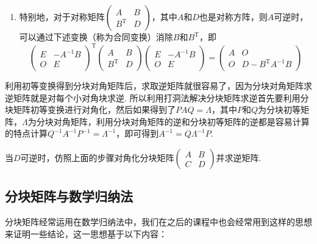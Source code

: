 \begin{enumerate}
    \item 特别地，对于对称矩阵$\begin{pmatrix}A & B \\ B^\mathrm{T} & D\end{pmatrix}$，其中$A$和$D$也是对称方阵，则$A$可逆时，可以通过下述变换（称为合同变换）消除$B$和$B^\mathrm{T}$，即
          \[ \begin{pmatrix}
                  E & -A^{-1}B \\ O & E
              \end{pmatrix}^\mathrm{T}\begin{pmatrix}
                  A & B \\ B^\mathrm{T} & D
              \end{pmatrix}\begin{pmatrix}
                  E & -A^{-1}B \\ O & E
              \end{pmatrix}=\begin{pmatrix}
                  A & O \\ O & D-B^\mathrm{T}A^{-1}B
              \end{pmatrix} \]
\end{enumerate}
利用初等变换得到分块对角矩阵后，求取逆矩阵就很容易了，因为分块对角矩阵求逆矩阵就是对每个小对角块求逆. 所以利用打洞法解决分块矩阵求逆首先要利用分块矩阵初等变换进行对角化，然后如果得到了$PAQ=\varLambda$，其中$P$和$Q$为分块初等矩阵，$\varLambda$为分块对角矩阵，利用分块对角矩阵的逆和分块初等矩阵的逆都是容易计算的特点计算$Q^{-1}A^{-1}P^{-1}=\varLambda^{-1}$，即可得到$A^{-1}=Q\varLambda^{-1}P$.
\begin{example}
    当$D$可逆时，仿照上面的步骤对角化分块矩阵$\begin{pmatrix}A & B \\ C & D\end{pmatrix}$并求逆矩阵.
\end{example}

\begin{solution}

\end{solution}

\subsection{分块矩阵与数学归纳法}

分块矩阵经常运用在数学归纳法中，我们在之后的课程中也会经常用到这样的思想来证明一些结论，这一思想基于以下内容：

